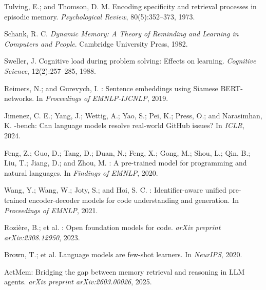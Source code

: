 \documentclass[letterpaper]{article} %
\begin{document}
\begin{thebibliography}{}
Tulving, E.; and Thomson, D. M.
\newblock Encoding specificity and retrieval processes in episodic memory.
\newblock \emph{Psychological Review}, 80(5):352--373, 1973.

Schank, R. C.
\newblock \emph{Dynamic Memory: A Theory of Reminding and Learning in Computers and People}.
\newblock Cambridge University Press, 1982.

Sweller, J.
\newblock Cognitive load during problem solving: Effects on learning.
\newblock \emph{Cognitive Science}, 12(2):257--285, 1988.

Reimers, N.; and Gurevych, I.
: Sentence embeddings using {Siamese} {BERT}-networks.
\newblock In \emph{Proceedings of EMNLP-IJCNLP}, 2019.

Jimenez, C. E.; Yang, J.; Wettig, A.; Yao, S.; Pei, K.; Press, O.; and Narasimhan, K.
-bench: Can language models resolve real-world {GitHub} issues?
\newblock In \emph{ICLR}, 2024.

Feng, Z.; Guo, D.; Tang, D.; Duan, N.; Feng, X.; Gong, M.; Shou, L.; Qin, B.; Liu, T.; Jiang, D.; and Zhou, M.
: A pre-trained model for programming and natural languages.
\newblock In \emph{Findings of EMNLP}, 2020.

Wang, Y.; Wang, W.; Joty, S.; and Hoi, S. C.
: Identifier-aware unified pre-trained encoder-decoder models for code understanding and generation.
\newblock In \emph{Proceedings of EMNLP}, 2021.

Rozi\`{e}re, B.; et al.
: Open foundation models for code.
\newblock \emph{arXiv preprint arXiv:2308.12950}, 2023.

Brown, T.; et al.
\newblock Language models are few-shot learners.
\newblock In \emph{NeurIPS}, 2020.

{ActMem}: Bridging the gap between memory retrieval and reasoning in {LLM} agents.
\newblock \emph{arXiv preprint arXiv:2603.00026}, 2025.

\end{thebibliography}
\end{document}
